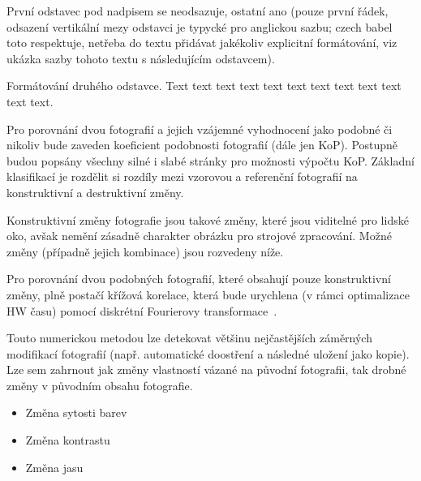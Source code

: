 
První odstavec pod nadpisem se neodsazuje, ostatní ano (pouze první řádek, odsazení vertikální mezy odstavci je typycké pro anglickou sazbu; czech babel toto respektuje, netřeba do textu přidávat jakékoliv explicitní formátování, viz ukázka sazby tohoto textu s následujícím odstavcem).

Formátování druhého odstavce. Text text text text text text text text text text text text.



Pro porovnání dvou fotografií a jejich vzájemné vyhodnocení jako podobné či nikoliv bude zaveden koeficient podobnosti fotografií (dále jen KoP). Postupně budou popsány všechny silné i slabé stránky pro možnosti výpočtu KoP. Základní klasifikací je rozdělit si rozdíly mezi vzorovou a referenční fotografií na konstruktivní a destruktivní změny.

Konstruktivní změny fotografie jsou takové změny, které jsou viditelné pro lidské oko, avšak nemění zásadně charakter obrázku pro strojové zpracování. Možné změny (případně jejich kombinace) jsou rozvedeny níže.

Pro porovnání dvou podobných fotografií, které obsahují pouze konstruktivní změny, plně postačí křížová korelace, která bude urychlena (v rámci optimalizace HW času) pomocí diskrétní Fourierovy transformace~\cite{FFT}.

Touto numerickou metodou lze detekovat většinu nejčastějších záměrných modifikací fotografií (např. automatické doostření a následné uložení jako kopie). Lze sem zahrnout jak změny vlastností vázané na původní fotografii, tak drobné změny v původním obsahu fotografie.

\begin{itemize}
	\setlength{\parskip}{0pt}
	\setlength{\itemsep}{0pt}
	\item{Změna sytosti barev}
	\item{Změna kontrastu}
	\item{Změna jasu}
\end{itemize}

